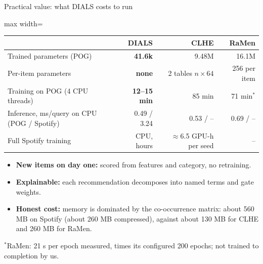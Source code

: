 \documentclass[10pt,aspectratio=169]{beamer}
\newcommand{\key}[1]{\textcolor{Accent}{\textbf{#1}}}
\newcommand{\fn}[1]{\textcolor{Muted}{\scriptsize #1}}
\begin{document}
\begin{frame}{Practical value: what DIALS costs to run}
\centering\renewcommand{\arraystretch}{1.35}\small
\begin{adjustbox}{max width=\textwidth}\begin{tabular}{lrrr}\toprule
& \key{DIALS} & CLHE & RaMen\\\midrule
Trained parameters (POG) & \textbf{41.6k} & 9.48M & 16.1M\\
Per-item parameters & \textbf{none} & 2 tables $n\times64$ & 256 per item\\
Training on POG (4 CPU threads) & \textbf{12--15 min} & 85 min & 71 min$^*$\\
Inference, ms/query on CPU (POG / Spotify) & 0.49 / 3.24 & 0.53 / -- & 0.69 / --\\
Full Spotify training & CPU, hours & $\approx$6.5 GPU-h per seed & --\\\bottomrule
\end{tabular}\end{adjustbox}\par
\raggedright\vspace{3mm}
\begin{itemize}\setlength\itemsep{3pt}
\item \key{New items on day one:} scored from features and category, no retraining.
\item \key{Explainable:} each recommendation decomposes into named terms and gate weights.
\item \key{Honest cost:} memory is dominated by the co-occurrence matrix: about 560 MB on Spotify (about 260 MB compressed), against about 130 MB for CLHE and 260 MB for RaMen.
\end{itemize}
\fn{$^*$RaMen: 21 s per epoch measured, times its configured 200 epochs; not trained to completion by us.}
\end{frame}
\end{document}
